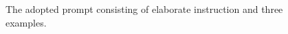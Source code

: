 \begin{figure}[t]
{    
\label{fig:Prompt1}}\vspace{-0.3cm}
    \caption{The adopted prompt consisting of elaborate instruction and three examples.
    }
    \label{fig:GenerationPrompt}

\end{figure}
